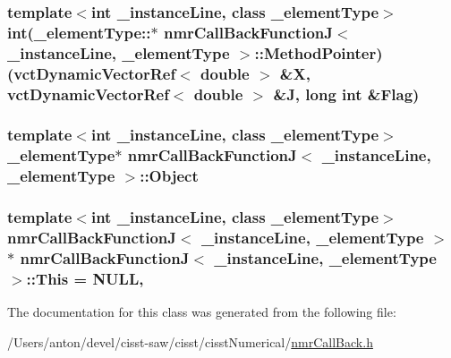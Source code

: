 \subsubsection[{Method\+Pointer}]{\setlength{\rightskip}{0pt plus 5cm}template$<$int \+\_\+instance\+Line, class \+\_\+element\+Type$>$ int(\+\_\+element\+Type\+::$\ast$ {\bf nmr\+Call\+Back\+Function\+J}$<$ \+\_\+instance\+Line, \+\_\+element\+Type $>$\+::Method\+Pointer) ({\bf vct\+Dynamic\+Vector\+Ref}$<$ double $>$ \&X, {\bf vct\+Dynamic\+Vector\+Ref}$<$ double $>$ \&J, long int \&Flag)\hspace{0.3cm}{\ttfamily [protected]}}\label{classnmr_call_back_function_j_a9b570108e94f3135a2fee94ba737aa2e}
\hypertarget{classnmr_call_back_function_j_a5c9d04ecebcf7162bdd42da632c59b7d}{}
\subsubsection[{Object}]{\setlength{\rightskip}{0pt plus 5cm}template$<$int \+\_\+instance\+Line, class \+\_\+element\+Type$>$ \+\_\+element\+Type$\ast$ {\bf nmr\+Call\+Back\+Function\+J}$<$ \+\_\+instance\+Line, \+\_\+element\+Type $>$\+::Object\hspace{0.3cm}{\ttfamily [protected]}}\label{classnmr_call_back_function_j_a5c9d04ecebcf7162bdd42da632c59b7d}
\hypertarget{classnmr_call_back_function_j_a5d6cc7cb52026f09dce7a569ad2e46ca}{}
\subsubsection[{This}]{\setlength{\rightskip}{0pt plus 5cm}template$<$int \+\_\+instance\+Line, class \+\_\+element\+Type$>$ {\bf nmr\+Call\+Back\+Function\+J}$<$ \+\_\+instance\+Line, \+\_\+element\+Type $>$ $\ast$ {\bf nmr\+Call\+Back\+Function\+J}$<$ \+\_\+instance\+Line, \+\_\+element\+Type $>$\+::This = N\+U\+L\+L\hspace{0.3cm}{\ttfamily [static]}, {\ttfamily [protected]}}\label{classnmr_call_back_function_j_a5d6cc7cb52026f09dce7a569ad2e46ca}


The documentation for this class was generated from the following file\+:\begin{DoxyCompactItemize}
\item 
/\+Users/anton/devel/cisst-\/saw/cisst/cisst\+Numerical/\hyperlink{nmr_call_back_8h}{nmr\+Call\+Back.\+h}\end{DoxyCompactItemize}
